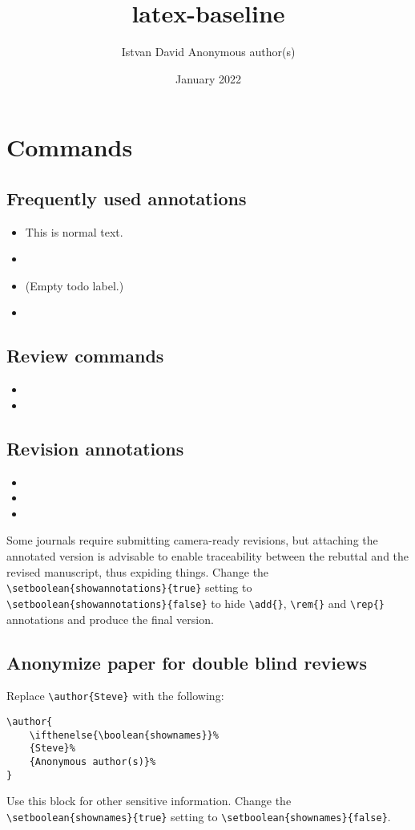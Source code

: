 \documentclass{article}
\title{latex-baseline}
\author{
    \ifthenelse{\boolean{shownames}}%
    {Istvan David}%
    {Anonymous author(s)}%
}
\date{January 2022}
\begin{document}
\maketitle

\section{Commands}

\subsection{Frequently used annotations}

\begin{itemize}
    \item This is normal text.
    \item {}
    \item \todo{} (Empty todo label.)
    \item {}
\end{itemize}

\subsection{Review commands}

\begin{itemize}
    \item {}
    \item {}
\end{itemize}

\subsection{Revision annotations}

\begin{itemize}
    \item {}
    \item {}
    \item {}
\end{itemize}

Some journals require submitting camera-ready revisions, but attaching the annotated version is advisable to enable traceability between the rebuttal and the revised manuscript, thus expiding things. Change the \verb|\setboolean{showannotations}{true}| setting to \verb|\setboolean{showannotations}{false}| to hide \verb|\add{}|, \verb|\rem{}| and \verb|\rep{}| annotations and produce the final version.

\subsection{Anonymize paper for double blind reviews}
Replace \verb|\author{Steve}| with the following:
\begin{verbatim}
\author{
    \ifthenelse{\boolean{shownames}}%
    {Steve}%
    {Anonymous author(s)}%
}
\end{verbatim}

Use this block for other sensitive information. Change the \verb|\setboolean{shownames}{true}| setting to \verb|\setboolean{shownames}{false}|.
\end{document}
